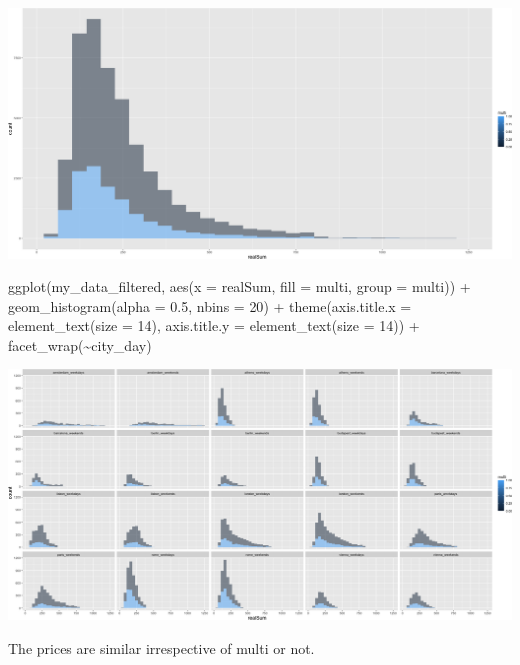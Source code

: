 \documentclass[
]{article}
\newenvironment{Shaded}{\begin{snugshade}}{\end{snugshade}}
\newcommand{\AttributeTok}[1]{\textcolor[rgb]{0.77,0.63,0.00}{#1}}
\newcommand{\DecValTok}[1]{\textcolor[rgb]{0.00,0.00,0.81}{#1}}
\newcommand{\FloatTok}[1]{\textcolor[rgb]{0.00,0.00,0.81}{#1}}
\newcommand{\FunctionTok}[1]{\textcolor[rgb]{0.00,0.00,0.00}{#1}}
\newcommand{\NormalTok}[1]{#1}
\newcommand{\SpecialCharTok}[1]{\textcolor[rgb]{0.00,0.00,0.00}{#1}}
\begin{document}
\includegraphics{Project_files/figure-latex/unnamed-chunk-21-2.png}

\begin{Shaded}
\begin{Highlighting}[]
\FunctionTok{ggplot}\NormalTok{(my\_data\_filtered, }\FunctionTok{aes}\NormalTok{(}\AttributeTok{x =}\NormalTok{ realSum, }\AttributeTok{fill =}\NormalTok{ multi, }\AttributeTok{group =}\NormalTok{ multi)) }\SpecialCharTok{+}
    \FunctionTok{geom\_histogram}\NormalTok{(}\AttributeTok{alpha =} \FloatTok{0.5}\NormalTok{, }\AttributeTok{nbins =} \DecValTok{20}\NormalTok{) }\SpecialCharTok{+} \FunctionTok{theme}\NormalTok{(}\AttributeTok{axis.title.x =} \FunctionTok{element\_text}\NormalTok{(}\AttributeTok{size =} \DecValTok{14}\NormalTok{),}
    \AttributeTok{axis.title.y =} \FunctionTok{element\_text}\NormalTok{(}\AttributeTok{size =} \DecValTok{14}\NormalTok{)) }\SpecialCharTok{+} \FunctionTok{facet\_wrap}\NormalTok{(}\SpecialCharTok{\textasciitilde{}}\NormalTok{city\_day)}
\end{Highlighting}
\end{Shaded}

\includegraphics{Project_files/figure-latex/unnamed-chunk-21-3.png}

The prices are similar irrespective of multi or not.
\end{document}
